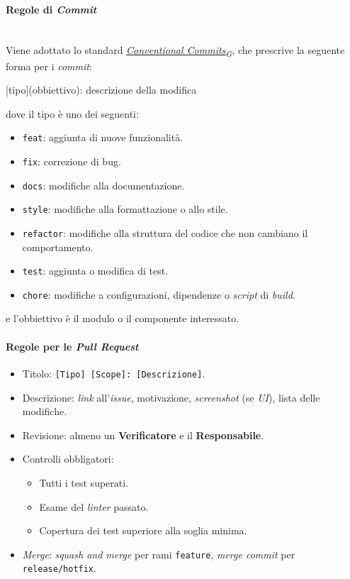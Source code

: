 \documentclass[12pt, a4paper]{article}
\newcommand{\urlglossario}{https://skynetunigroup.github.io/Code_Guardian/Documentazione/PB/glossario_v2.0.0.pdf} %
\newcommand{\glo}[2]{\href{\urlglossario\#nameddest=#2}{#1\textsubscript{G}}}
\begin{document}
\paragraph{Regole di \textit{Commit}}~\\
Viene adottato lo standard \textit{\glo{Conventional Commits}{conventional-commits}}, che prescrive la seguente forma per i \textit{commit}:
\begin{center}
    [tipo](obbiettivo): descrizione della modifica
\end{center}
dove il tipo è uno dei seguenti:
\begin{itemize}
    \item \texttt{feat}: aggiunta di nuove funzionalità.
    \item \texttt{fix}: correzione di bug.
    \item \texttt{docs}: modifiche alla documentazione.
    \item \texttt{style}: modifiche alla formattazione o allo stile.
    \item \texttt{refactor}: modifiche alla struttura del codice che non cambiano il comportamento.
    \item \texttt{test}: aggiunta o modifica di test.
    \item \texttt{chore}: modifiche a configurazioni, dipendenze o \textit{script} di \textit{build}.
\end{itemize}
e l'obbiettivo è il modulo o il componente interessato.

\paragraph{Regole per le \textit{Pull Request}}
\begin{itemize}
    \item Titolo: \texttt{[Tipo] [Scope]: [Descrizione]}.
    \item Descrizione: \textit{link} all'\textit{issue}, motivazione, \textit{screenshot} (se \textit{UI}), lista delle modifiche.
    \item Revisione: almeno un \textbf{Verificatore} e il \textbf{Responsabile}.
    \item Controlli obbligatori:
    \begin{itemize}
        \item Tutti i test superati.
        \item Esame del \textit{linter} passato.
        \item Copertura dei test superiore alla soglia minima.
    \end{itemize}
    \item \textit{Merge}: \textit{squash and merge} per rami \texttt{feature}, \textit{merge commit} per \texttt{release/hotfix}.
\end{itemize}
\end{document}
